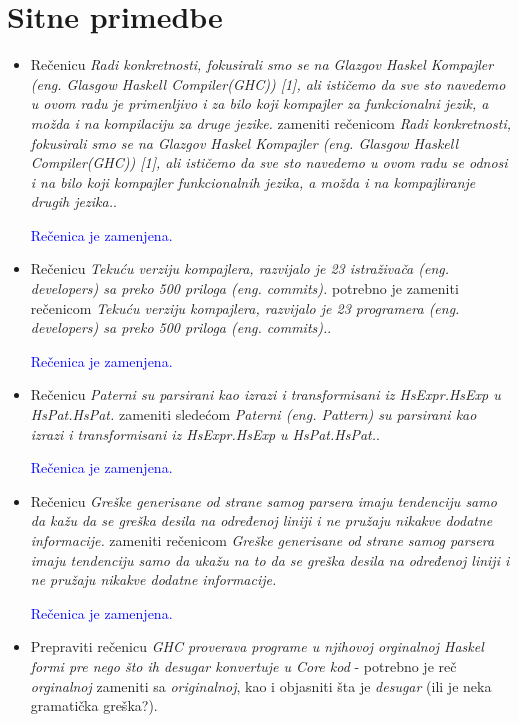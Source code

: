 \documentclass[a4paper]{report}
\newcommand{\odgovor}[1]{\textcolor{blue}{#1}}
\begin{document}
\section{Sitne primedbe}
\begin{itemize}
\item Rečenicu \textit{Radi konkretnosti, fokusirali smo se na Glazgov Haskel Kompajler (eng. Glasgow Haskell Compiler(GHC)) [1], ali ističemo da sve sto navedemo u ovom radu je primenljivo i za bilo koji kompajler za funkcionalni jezik, a možda i na kompilaciju za druge jezike.} zameniti rečenicom \textit{Radi konkretnosti, fokusirali smo se na Glazgov Haskel Kompajler (eng. Glasgow Haskell Compiler(GHC)) [1], ali ističemo da sve sto navedemo u ovom radu se odnosi i na bilo koji kompajler funkcionalnih jezika, a možda i na kompajliranje drugih jezika.}. 

\odgovor{Rečenica je zamenjena.}

\item Rečenicu \textit{Tekuću verziju kompajlera, razvijalo je 23 istraživača (eng. developers) sa preko 500 priloga (eng. commits).}  potrebno je zameniti rečenicom \textit{Tekuću verziju kompajlera, razvijalo je 23 programera (eng. developers) sa preko 500 priloga (eng. commits).}.

\odgovor{Rečenica je zamenjena.}

\item Rečenicu \textit{Paterni su parsirani kao izrazi i transformisani iz HsExpr.HsExp u HsPat.HsPat.} zameniti sledećom \textit{Paterni (eng. Pattern) su parsirani kao izrazi i transformisani iz HsExpr.HsExp u HsPat.HsPat.}.

\odgovor{Rečenica je zamenjena.}

\item Rečenicu \textit{Greške generisane od strane samog parsera imaju tendenciju samo da kažu da se greška desila na određenoj liniji i ne pružaju nikakve dodatne informacije.} zameniti rečenicom \textit{Greške generisane od strane samog parsera imaju tendenciju samo da ukažu na to da se greška desila na određenoj liniji i ne pružaju nikakve dodatne informacije.}

\odgovor{Rečenica je zamenjena.}

\item Prepraviti rečenicu \textit{GHC proverava programe u njihovoj orginalnoj Haskel formi pre nego što ih desugar konvertuje u Core kod} - potrebno je reč \textit{orginalnoj} zameniti sa \textit{originalnoj}, kao i objasniti šta je \textit{desugar} (ili je neka gramatička greška?).


\end{itemize}
\end{document}
